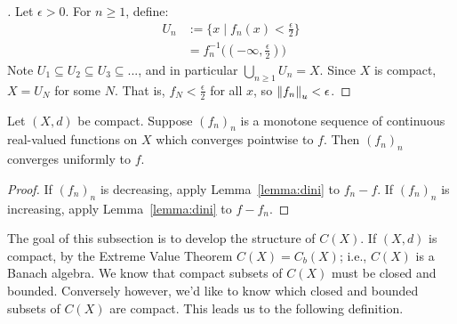         \begin{proof}[]
            Let $\epsilon > 0$. For $n \geq 1$, define:
                \begin{equation*}
                \begin{split}
                    U_n 
                    & := \{x \mid f_n(x) < \frac{\epsilon}{2}\} \\
                    &= f_n^{-1}\bigl((-\infty,\frac{\epsilon}{2})\bigr)
                \end{split}
                \end{equation*}
            Note $U_1 \subseteq U_2 \subseteq U_3 \subseteq ...$, and in particular $\bigcup_{n \geq 1}U_n = X$. Since $X$ is compact, $X = U_N$ for some $N$. That is, $f_N < \frac{\epsilon}{2}$ for all $x$, so $\left\lVert f_n \right\rVert_u < \epsilon$.
        \end{proof}

    \begin{theorem}
        Let $(X,d)$ be compact. Suppose $(f_n)_n$ is a monotone sequence of continuous real-valued functions on $X$ which converges pointwise to $f$. Then $(f_n)_n$ converges uniformly to $f$.
    \end{theorem}
        \begin{proof}
            If $(f_n)_n$ is decreasing, apply Lemma~\ref{lemma:dini} to $f_n - f$. If $(f_n)_n$ is increasing, apply Lemma~\ref{lemma:dini} to $f - f_n$.
        \end{proof}

    \begin{center}
    \end{center}

    The goal of this subsection is to develop the structure of $C(X)$. If $(X,d)$ is compact, by the Extreme Value Theorem $C(X) = C_b(X)$; i.e., $C(X)$ is a Banach algebra. We know that compact subsets of $C(X)$ must be closed and bounded. Conversely however, we'd like to know which closed and bounded subsets of $C(X)$ are compact. This leads us to the following definition.

